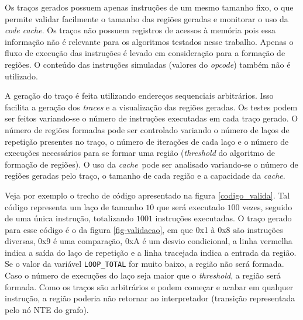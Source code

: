 \documentclass[12pt,twoside]{article}
\newcommand{\ccache}{\emph{code cache}}
\newcommand{\cache}{\emph{cache}}
\begin{document}
Os traços gerados possuem apenas instruções de um mesmo tamanho fixo, o que permite validar facilmente o tamanho das regiões geradas e monitorar o uso da \ccache. Os traços não possuem registros de acessos à memória pois essa informação não é relevante para os algoritmos testados nesse trabalho. Apenas o fluxo de execução das instruções é levado em consideração para a formação de regiões. O conteúdo das instruções simuladas (valores do \emph{opcode}) também não é utilizado. 

A geração do traço é feita utilizando endereços sequenciais arbitrários. Isso facilita a geração dos \emph{traces} e a visualização das regiões geradas. Os testes podem ser feitos variando-se o número de instruções executadas em cada traço gerado. O número de regiões formadas pode ser controlado variando o número de laços de repetição presentes no traço, o número de iterações de cada laço e o número de execuções necessários para se formar uma região (\emph{threshold} do algoritmo de formação de regiões). O uso da \cache~pode ser analisado variando-se o número de regiões geradas pelo traço, o tamanho de cada região e a capacidade da \cache.%

Veja por exemplo o trecho de código apresentado na figura \ref{codigo_valida}. Tal código representa um laço de tamanho $10$ que será executado $100$ vezes, seguido de uma única instrução, totalizando $1001$ instruções executadas. O traço gerado para esse código é o da figura \ref{fig-validacao}, em que 0x1 à 0x8 são instruções diversas, 0x9 é uma comparação, 0xA é um desvio condicional, a linha vermelha indica a saída do laço de repetição e a linha tracejada indica a entrada da região. Se o valor da variável \texttt{LOOP\_TOTAL} for muito baixo, a região não será formada. Caso o número de execuções do laço seja maior que o \emph{threshold}, a região será formada. Como os traços são arbitrários e podem começar e acabar em qualquer instrução, a região poderia não retornar ao interpretador (transição representada pelo nó NTE do grafo).
\end{document}

